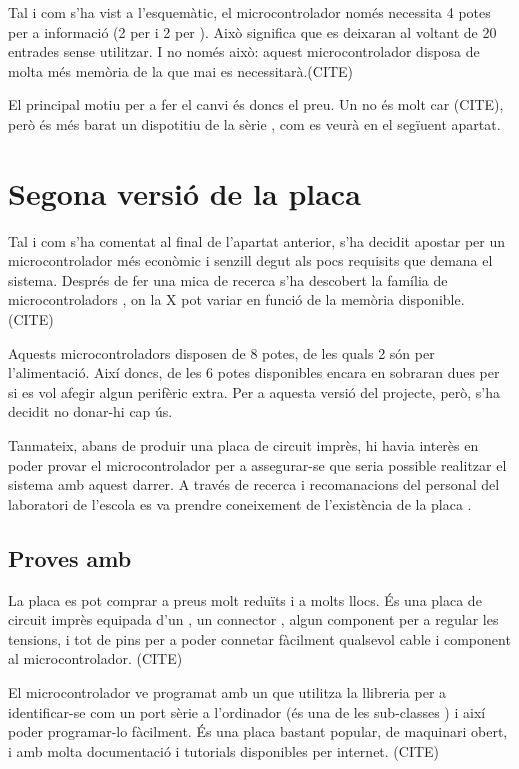 Tal i com s'ha vist a l'esquemàtic, el microcontrolador només necessita 4 potes
per a informació (2 per  i 2 per ). Això significa que es
deixaran al voltant de 20 entrades sense utilitzar. I no només això: aquest
microcontrolador disposa de molta més memòria de la que mai es necessitarà.(CITE)

El principal motiu per a fer el canvi és doncs el preu. Un 
no és molt car (CITE), però és més barat un dispotitiu  de la sèrie
, com es veurà en el segïuent apartat.

\section{Segona versió de la placa}

Tal i com s'ha comentat al final de l'apartat anterior, s'ha decidit apostar
per un microcontrolador més econòmic i senzill degut als pocs requisits que
demana el sistema. Després de fer una mica de recerca s'ha descobert la
família de microcontroladors , on la X pot variar en funció de
la memòria  disponible. (CITE)

Aquests microcontroladors disposen de 8 potes, de les quals 2 són per
l'alimentació. Així doncs, de les 6 potes disponibles encara en sobraran dues
per si es vol afegir algun perifèric extra. Per a aquesta versió del projecte,
però, s'ha decidit no donar-hi cap ús.

Tanmateix, abans de produir una placa de circuit imprès, hi havia interès en
poder provar el microcontrolador per a assegurar-se que seria possible
realitzar el sistema amb aquest darrer. A través de recerca i recomanacions del
personal del laboratori de l'escola es va prendre coneixement de l'existència de
la placa .

\subsection{Proves amb }
\label{subsec:hw_digispark}

La placa  es pot comprar a preus molt reduïts i a molts llocs.
És una placa de circuit imprès equipada d'un , un connector
, algun component per a regular les tensions, i tot de pins per a
poder connetar fàcilment qualsevol cable i component al microcontrolador. (CITE)

El microcontrolador ve programat amb un  que utilitza la
llibreria  per a identificar-se com un port sèrie a l'ordinador
(és una de les sub-classes ) i així poder programar-lo fàcilment.
És una placa bastant popular, de maquinari obert, i amb molta documentació i
tutorials disponibles per internet. (CITE)

